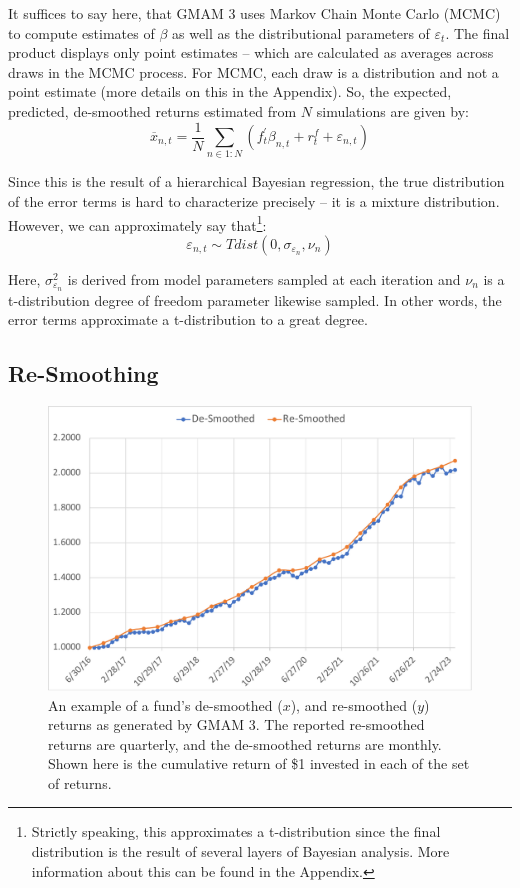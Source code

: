 \documentclass[11pt]{article}
\begin{document}
It suffices to say here, that GMAM 3 uses Markov Chain Monte Carlo (MCMC) to compute estimates of $\beta$ as well as the distributional parameters of $\varepsilon_t$. The final product displays only point estimates – which are calculated as averages across draws in the MCMC process. For MCMC, each draw is a distribution and not a point estimate (more details on this in the Appendix). So, the expected, predicted, de-smoothed returns estimated from $N$ simulations are given by:
\begin{equation}
	\overline{x}_{n,t} = \frac{1}{N} \sum_{n \in 1:N} \left( f^{\prime}_t \beta_{n,t} + r_t^f + \varepsilon_{n,t} \right)
\end{equation}

Since this is the result of a hierarchical Bayesian regression, the true distribution of the error terms is hard to characterize precisely -- it is a mixture distribution. However, we can approximately say that\footnote{Strictly speaking, this approximates a t-distribution since the final distribution is the result of several layers of Bayesian analysis. More information about this can be found in the Appendix.}:
\begin{equation*}
	\varepsilon_{n,t} \sim Tdist \left( 0, \sigma_{\varepsilon_n}, \nu_n \right)
\end{equation*}

Here, $\sigma_{\varepsilon_n}^2$  is derived from model parameters sampled at each iteration and $\nu_n$  is a t-distribution degree of freedom parameter likewise sampled. In other words, the error terms approximate a t-distribution to a great degree.

\subsection{Re-Smoothing}
\label{subsec:resmoothing}

\begin{figure}[!h]
	\centering
	\includegraphics[width=400pt]{smoothed.pdf}
	\parbox{400pt}{\caption{An example of a fund’s de-smoothed ($x$), and re-smoothed ($y$) returns as generated by GMAM 3. The reported re-smoothed returns are quarterly, and the de-smoothed returns are monthly. Shown here is the cumulative return of \$1 invested in each of the set of returns. }}
\end{figure}
\end{document}
